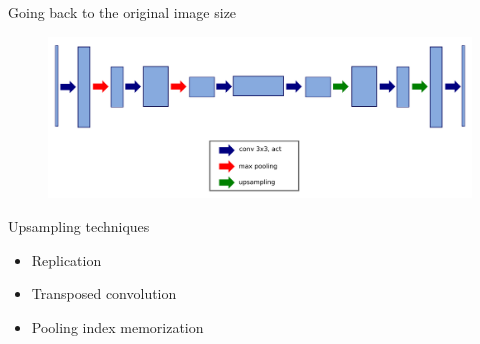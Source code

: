 \documentclass[xcolor=pdftex,dvipsnames,table,mathserif]{beamer}
\begin{document}
\begin{frame}{Going back to the original image size}

    \begin{figure}
      \includegraphics[width=\textwidth]{going_back.png}
    \end{figure}

\end{frame}


\begin{frame}{Upsampling techniques}


\begin{itemize}
\item Replication
\item Transposed convolution
\item Pooling index memorization
\end{itemize}

\end{frame}
\end{document}
